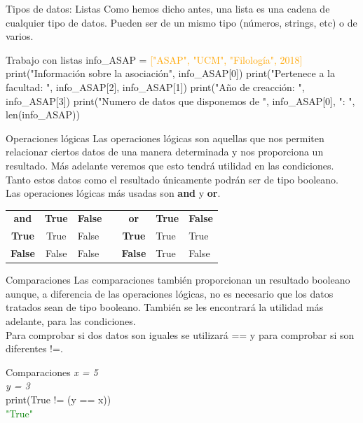 \documentclass{beamer}
\begin{document}
\begin{frame}{Tipos de datos: Listas}
\label{datos:listas}
Como hemos dicho antes, una lista es una cadena de cualquier tipo de datos. Pueden ser de un mismo tipo (números, strings, etc) o de varios.
\begin{Programexample}{Trabajo con listas}
info\_ASAP = \textcolor{orange}{["ASAP", "UCM", "Filología", 2018]}
\newline\newline
print("Información sobre la asociación",  info\_ASAP[0])\newline
print("Pertenece a la facultad: ", info\_ASAP[2], info\_ASAP[1]) \newline
print("Año de creacción: ", info\_ASAP[3])\newline
print("Numero de datos que disponemos de ", info\_ASAP[0], ": ", len(info\_ASAP))
\end{Programexample}
\end{frame}

\begin{frame}{Operaciones lógicas}
Las operaciones lógicas son aquellas que nos permiten relacionar ciertos datos de una manera determinada y nos proporciona un resultado. Más adelante veremos que esto tendrá utilidad en las condiciones.\\
Tanto estos datos como el resultado únicamente podrán ser de tipo booleano.\\
Las operaciones lógicas más usadas son \textbf{and} y \textbf{or}.
\begin{table}[]
\begin{tabular}{|c|c|l|l|c|l|l|}
\cline{1-3} \cline{5-7}
\textbf{and}   & \textbf{True}  & \textbf{False} &  & \textbf{or}    & \textbf{True} & \textbf{False} \\ \cline{1-3} \cline{5-7} 
\textbf{True}  & True  & False &  & \textbf{True}  & True & True  \\ \cline{1-3} \cline{5-7} 
\textbf{False} & False & False &  & \textbf{False} & True & False \\ \cline{1-3} \cline{5-7} 
\end{tabular}
\end{table}
\end{frame}

\begin{frame}{Comparaciones}
Las comparaciones también proporcionan un resultado booleano aunque, a diferencia de las operaciones lógicas, no es necesario que los datos tratados sean de tipo booleano. También se les encontrará la utilidad más adelante, para las condiciones.\\
Para comprobar si dos datos son iguales se utilizará == y para comprobar si son diferentes !=.
\begin{Programexample} {Comparaciones}
\centering
\textit{x = 5}\\
\textit{y = 3}\\
print(True != (y == x))\\
\textcolor{green}{"True"}
\end{Programexample}
\end{frame}
\end{document}
